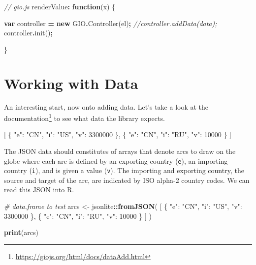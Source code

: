 \documentclass[
]{krantz}
\makeatletter
\newenvironment{Shaded}{\begin{snugshade}}{\end{snugshade}}
\newcommand{\CommentTok}[1]{\textcolor[rgb]{0.37,0.37,0.37}{\textit{#1}}}
\newcommand{\DataTypeTok}[1]{\textcolor[rgb]{0.27,0.27,0.27}{#1}}
\newcommand{\DecValTok}[1]{\textcolor[rgb]{0.06,0.06,0.06}{#1}}
\newcommand{\FunctionTok}[1]{\textcolor[rgb]{0,0,0}{#1}}
\newcommand{\KeywordTok}[1]{\textcolor[rgb]{0.27,0.27,0.27}{\textbf{#1}}}
\newcommand{\NormalTok}[1]{#1}
\newcommand{\OperatorTok}[1]{\textcolor[rgb]{0.43,0.43,0.43}{\textbf{#1}}}
\newcommand{\OtherTok}[1]{\textcolor[rgb]{0.37,0.37,0.37}{#1}}
\newcommand{\StringTok}[1]{\textcolor[rgb]{0.5,0.5,0.5}{#1}}
\renewcommand{\href}[2]{#2\footnote{\url{#1}}}
\newenvironment{kframe}{%
\medskip{}
\setlength{\fboxsep}{.8em}
 \def\at@end@of@kframe{}%
 \ifinner\ifhmode%
  \def\at@end@of@kframe{\end{minipage}}%
  \begin{minipage}{\columnwidth}%
 \fi\fi%
 \def\FrameCommand##1{\hskip\@totalleftmargin \hskip-\fboxsep
 \colorbox{shadecolor}{##1}\hskip-\fboxsep
     \hskip-\linewidth \hskip-\@totalleftmargin \hskip\columnwidth}%
 \MakeFramed {\advance\hsize-\width
   \@totalleftmargin\z@ \linewidth\hsize
   \@setminipage}}%
 {\par\unskip\endMakeFramed%
 \at@end@of@kframe}
\renewenvironment{Shaded}{\begin{kframe}}{\end{kframe}}
\makeatother
\begin{document}
\begin{Shaded}
\begin{Highlighting}[]
\CommentTok{// gio.js}
\NormalTok{renderValue}\OperatorTok{:} \KeywordTok{function}\NormalTok{(x) \{}

  \KeywordTok{var}\NormalTok{ controller }\OperatorTok{=} \KeywordTok{new}\NormalTok{ GIO}\OperatorTok{.}\FunctionTok{Controller}\NormalTok{(el)}\OperatorTok{;}
  \CommentTok{//controller.addData(data);}
\NormalTok{  controller}\OperatorTok{.}\FunctionTok{init}\NormalTok{()}\OperatorTok{;}

\NormalTok{\}}
\end{Highlighting}
\end{Shaded}

\hypertarget{widgets-full-data}{%
\section{Working with Data}\label{widgets-full-data}}

An interesting start, now onto adding data. Let's take a look at the \href{https://giojs.org/html/docs/dataAdd.html}{documentation} to see what data the library expects.

\begin{Shaded}
\begin{Highlighting}[]
\OtherTok{[}
  \FunctionTok{\{}
    \DataTypeTok{"e"}\FunctionTok{:} \StringTok{"CN"}\FunctionTok{,}
    \DataTypeTok{"i"}\FunctionTok{:} \StringTok{"US"}\FunctionTok{,}
    \DataTypeTok{"v"}\FunctionTok{:} \DecValTok{3300000}
  \FunctionTok{\}}\OtherTok{,}
  \FunctionTok{\{}
    \DataTypeTok{"e"}\FunctionTok{:} \StringTok{"CN"}\FunctionTok{,}
    \DataTypeTok{"i"}\FunctionTok{:} \StringTok{"RU"}\FunctionTok{,}
    \DataTypeTok{"v"}\FunctionTok{:} \DecValTok{10000}
  \FunctionTok{\}}
\OtherTok{]}
\end{Highlighting}
\end{Shaded}

The JSON data should constitutes of arrays that denote arcs to draw on the globe where each arc is defined by an exporting country (\texttt{e}), an importing country (\texttt{i}), and is given a value (\texttt{v}). The importing and exporting country, the source and target of the arc, are indicated by ISO alpha-2 country codes. We can read this JSON into R.

\begin{Shaded}
\begin{Highlighting}[]
\CommentTok{\# data.frame to test}
\NormalTok{arcs \textless{}{-}}\StringTok{ }\NormalTok{jsonlite}\OperatorTok{::}\KeywordTok{fromJSON}\NormalTok{(}
  \StringTok{\textquotesingle{}[}
\StringTok{    \{}
\StringTok{      "e": "CN",}
\StringTok{      "i": "US",}
\StringTok{      "v": 3300000}
\StringTok{    \},}
\StringTok{    \{}
\StringTok{      "e": "CN",}
\StringTok{      "i": "RU",}
\StringTok{      "v": 10000}
\StringTok{    \}}
\StringTok{  ]\textquotesingle{}}
\NormalTok{)}

\KeywordTok{print}\NormalTok{(arcs)}
\end{Highlighting}
\end{Shaded}
\end{document}
